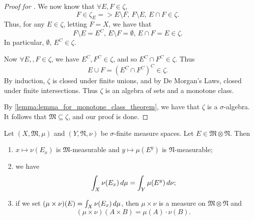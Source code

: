 \documentclass[notoc,notitlepage]{tufte-book}
\begin{document}
\begin{proof}[Proof for ]
  We now know that $\forall E, F \in \zeta$,
  \begin{equation*}
    F \in \zeta_E => E \setminus F,\, F \setminus E,\, E \cap F \in \zeta.
  \end{equation*}
  Thus, for any $E \in \zeta$, letting $F = X$, we have that
  \begin{equation*}
    F \setminus E = E^C,\, E \setminus F = \emptyset,\, E \cap F = E \in \zeta.
  \end{equation*}
  In particular, $\emptyset,\, E^C \in \zeta$.

  Now $\forall E,, F \in \zeta$, we have $E^C, F^C \in \zeta$,
  and so $E^C \cap F^C \in \zeta$. Thus
  \begin{equation*}
    E \cup F = (E^C \cap F^C)^C \in \zeta.
  \end{equation*}
  By induction, $\zeta$ is closed under finite unions,
  and by De Morgan's Laws, closed under finite intersections.
  Thus $\zeta$ is an algebra of sets and a monotone class.

  By \cref{lemma:lemma_for_monotone_class_theorem}, 
  we have that $\zeta$ is a $\sigma$-algebra.
  It follows that $\mathfrak{M} \subseteq \zeta$,
  and our proof is done.
\end{proof}

\begin{thm}\label{thm:existence_of_product_measures_for_sigma_finite_measure_spaces}
  Let $(X, \mathfrak{M}, \mu)$ and $(Y, \mathfrak{N}, \nu)$
  be $\sigma$-finite measure spaces.
  Let $E \in \mathfrak{M} \otimes \mathfrak{N}$. Then
  \begin{enumerate}
    \item $x \mapsto \nu(E_x)$ is $\mathfrak{M}$-measurable and
      $y \mapsto \mu(E^y)$ is $\mathfrak{N}$-measurable;
    \item we have
      \begin{equation*}
        \int_{X} \nu(E_x) \mathop{}\!d{\mu} = \int_{Y} \mu(E^y) \mathop{}\!d{\nu};
      \end{equation*}
    \item if we set $(\mu \times \nu)(E) = \int_{X} \nu(E_x) \mathop{}\!d{\mu}$,
      then $\mu \times \nu$ is a measure on $\mathfrak{M} \otimes \mathfrak{N}$
      and
      \begin{equation*}
        (\mu \times \nu)(A \times B) = \mu(A) \cdot \nu(B).
      \end{equation*}
  \end{enumerate}
\end{thm}
\end{document}
